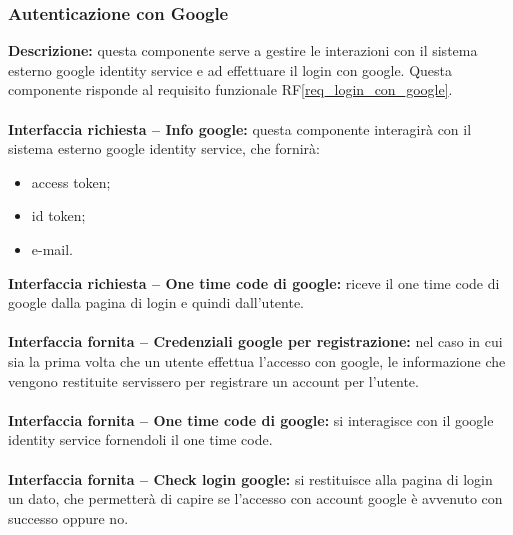 \subsubsection{Autenticazione con Google}
\textbf{Descrizione:} questa componente serve a gestire le interazioni con il sistema esterno google identity service e ad effettuare il login con google. Questa componente risponde al requisito funzionale RF\ref{req_login_con_google}. \\
\\
\textbf{Interfaccia richiesta – Info google:} questa componente interagirà con il sistema esterno google identity service, che fornirà:
\begin{itemize}
    \item access token;
    \item id token;
    \item e-mail.
\end{itemize}
\noindent
\textbf{Interfaccia richiesta – One time code di google:} riceve il one time code di google dalla pagina di login e quindi dall'utente. \\
\\
\textbf{Interfaccia fornita – Credenziali google per registrazione:} nel caso in cui sia la prima volta che un utente effettua l'accesso con google, le informazione che vengono restituite servissero per registrare un account per l'utente. \\
\\
\textbf{Interfaccia fornita – One time code di google:} si interagisce con il google identity service fornendoli il one time code.\\
\\
\textbf{Interfaccia fornita – Check login google:} si restituisce alla pagina di login un dato, che permetterà di capire se l'accesso con account google è avvenuto con successo oppure no. \\
\\

